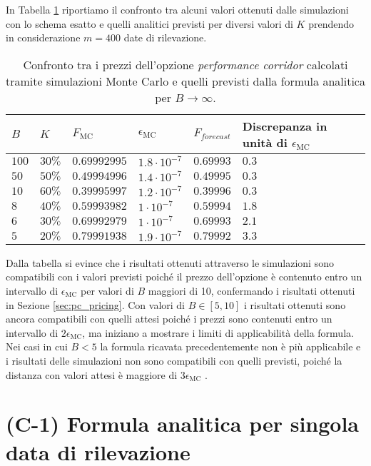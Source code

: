In Tabella \ref{tab:Teo-MC_B} riportiamo il confronto tra alcuni valori ottenuti dalle simulazioni con lo schema esatto e quelli analitici previsti per diversi valori di $K$ prendendo in considerazione $m=400$ date di rilevazione.

\begin{table}[t]
\small
\centering
\begin{tabular}{|l|l|l|l|l|l|l|l|}
\hline
$B$ & $K$ & $F_\text{MC}$ & $\epsilon_\text{MC}$ & $F_{forecast}$ & Discrepanza in unità di $\epsilon_\text{MC}$ \\
\hline \hline
$100$ & $30\%$ & $0.69992995$ & $1.8 \cdot 10^{-7}$ &
$0.69993$ & $0.3$\\ \hline
$50$ & $50\%$ & $0.49994996$ & $1.4 \cdot 10^{-7}$ & $0.49995$ & $0.3$\\ \hline
$10$ & $60\%$ & $0.39995997$ & $1.2 \cdot 10^{-7}$ & $0.39996$ & $0.3$\\ \hline
$8$ & $40\%$ & $0.59993982$ & $1 \cdot 10^{-7}$ & $0.59994$ & $1.8$\\ \hline
$6$ & $30\%$ & $0.69992979$ & $1 \cdot 10^{-7}$ & $0.69993$ & $2.1$\\ \hline
$5$ & $20\%$ & $0.79991938$ & $1.9 \cdot 10^{-7}$ & $0.79992$ & $3.3$\\ \hline
\end{tabular}
\caption{Confronto tra i prezzi dell'opzione \textit{performance corridor} calcolati tramite simulazioni Monte Carlo e quelli previsti dalla formula analitica per $B \rightarrow \infty$.}
\label{tab:Teo-MC_B}
\end{table}


Dalla tabella si evince che i risultati ottenuti attraverso le simulazioni sono compatibili con i valori previsti poiché il prezzo dell'opzione è contenuto entro un intervallo di $\epsilon_\text{MC}$ per valori di $B$ maggiori di 10, confermando i risultati ottenuti in Sezione \ref{sec:pc_pricing}. Con valori di $B \in [5,10]$ i risultati ottenuti sono ancora compatibili con quelli attesi poiché i prezzi sono contenuti entro un intervallo di $2 \epsilon_\text{MC}$, ma iniziano a mostrare i limiti di applicabilità della formula. Nei casi in cui $B<5$ la formula ricavata precedentemente non è più applicabile e i risultati delle simulazioni non sono compatibili con quelli previsti, poiché la distanza con valori attesi è maggiore di $3 \epsilon_\text{MC}$ .

\section{(C-1) Formula analitica per singola data di rilevazione}

